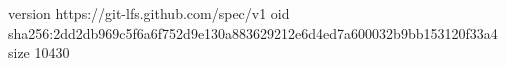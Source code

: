 version https://git-lfs.github.com/spec/v1
oid sha256:2dd2db969c5f6a6f752d9e130a883629212e6d4ed7a600032b9bb153120f33a4
size 10430
